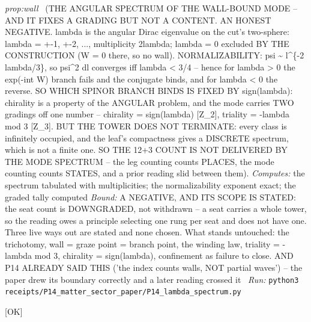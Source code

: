 \begin{description}
\textit{prop:wall} \ (THE ANGULAR SPECTRUM OF THE WALL-BOUND MODE -- AND IT FIXES A GRADING BUT NOT A CONTENT. AN HONEST NEGATIVE. lambda is the angular Dirac eigenvalue on the cut's two-sphere: lambda = +-1, +-2, ..., multiplicity 2\textbar{}lambda\textbar{}; lambda = 0 excluded BY THE CONSTRUCTION (W = 0 there, so no wall). NORMALIZABILITY: psi \textasciitilde{} l\textasciicircum{}\{-2 lambda/3\}, so \textbar{}psi\textbar{}\textasciicircum{}2 dl converges iff lambda < 3/4 -- hence for lambda > 0 the exp(-int W) branch fails and the conjugate binds, and for lambda < 0 the reverse. SO WHICH SPINOR BRANCH BINDS IS FIXED BY sign(lambda): chirality is a property of the ANGULAR problem, and the mode carries TWO gradings off one number -- chirality = sign(lambda) [Z\_2], triality = -lambda mod 3 [Z\_3]. BUT THE TOWER DOES NOT TERMINATE: every class is infinitely occupied, and the leaf's compactness gives a DISCRETE spectrum, which is not a finite one. SO THE 12+3 COUNT IS NOT DELIVERED BY THE MODE SPECTRUM -- the leg counting counts PLACES, the mode counting counts STATES, and a prior reading slid between them). 
\emph{Computes:} the spectrum tabulated with multiplicities; the normalizability exponent exact; the graded tally computed
 \emph{Bound:} A NEGATIVE, AND ITS SCOPE IS STATED: the seat count is DOWNGRADED, not withdrawn -- a seat carries a whole tower, so the reading owes a principle selecting one rung per seat and does not have one. Three live ways out are stated and none chosen. What stands untouched: the trichotomy, wall = graze point = branch point, the winding law, triality = -lambda mod 3, chirality = sign(lambda), confinement as failure to close. AND P14 ALREADY SAID THIS ('the index counts walls, NOT partial waves') -- the paper drew its boundary correctly and a later reading crossed it
\ \emph{Run:} \texttt{python3 receipts/P14\_matter\_sector\_paper/P14\_lambda\_spectrum.py}
\item[\rcptlabel{P14_mode_monodromy_at_the_wall}{P14R49}\textbf{P14R49}\quad\texttt{P14\_mode\_monodromy\_at\_the\_wall}]\hfill\textsf{[OK]}\\

\end{description}
